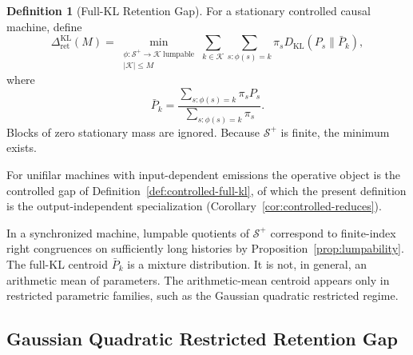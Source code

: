 \documentclass[12pt]{article}
\theoremstyle{definition}
\newtheorem{definition}[theorem]{Definition}
\newcommand{\RetKL}{\Delta_{\mathrm{ret}}^{\mathrm{KL}}}
\newcommand{\Splus}{\mathcal S^{+}}
\begin{document}
\begin{definition}[Full-KL Retention Gap]
\label{def:full-kl-retention}
For a stationary controlled causal machine, define
\[
\RetKL(M)
=
\min_{\substack{
\phi:\Splus\to\mathcal K\ \text{lumpable}\\
|\mathcal K|\le M
}}
\sum_{k\in\mathcal K}
\sum_{s:\phi(s)=k}
\pi_s
D_{\mathrm{KL}}(P_s\|\bar P_k),
\]
where
\[
\bar P_k
=
\frac{
\sum_{s:\phi(s)=k}\pi_s P_s
}{
\sum_{s:\phi(s)=k}\pi_s
}.
\]
Blocks of zero stationary mass are ignored.  Because $\Splus$ is finite, the
minimum exists.

For unifilar machines with input-dependent emissions the operative object is
the controlled gap of Definition~\ref{def:controlled-full-kl}, of which the
present definition is the output-independent specialization
(Corollary~\ref{cor:controlled-reduces}).
\end{definition}

In a synchronized machine, lumpable quotients of $\Splus$ correspond to
finite-index right congruences on sufficiently long histories by
Proposition~\ref{prop:lumpability}.  The full-KL centroid $\bar P_k$ is a
mixture distribution.  It is not, in general, an arithmetic mean of
parameters.  The arithmetic-mean centroid appears only in restricted
parametric families, such as the Gaussian quadratic restricted regime.

\subsection{Gaussian Quadratic Restricted Retention Gap}
\label{subsec:gaussian-quadratic}
\end{document}
